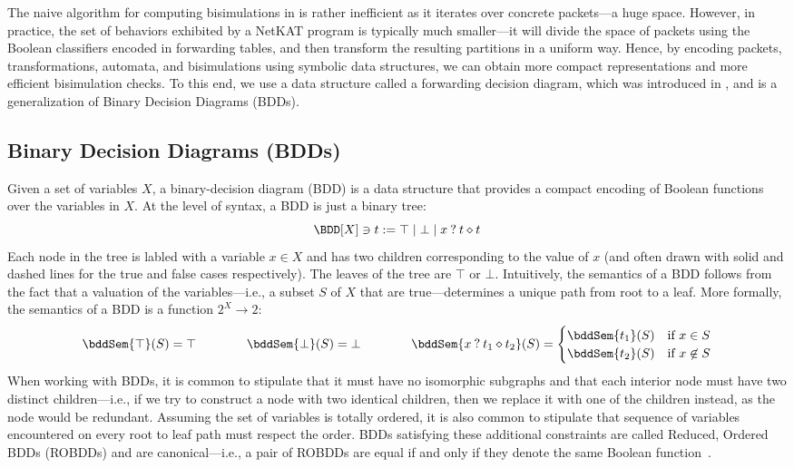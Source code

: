 
The naive algorithm for computing bisimulations in  is
rather inefficient as it iterates over concrete packets---a huge
space. However, in practice, the set of behaviors exhibited by a
NetKAT program is typically much smaller---it will divide the space of
packets using the Boolean classifiers encoded in forwarding tables,
and then transform the resulting partitions in a uniform way. Hence,
by encoding packets, transformations, automata, and bisimulations
using symbolic data structures, we can obtain more compact
representations and more efficient bisimulation checks. To this end,
we use a data structure called a forwarding decision diagram, which
was introduced in \cite{fastcompiler}, and is a generalization of
Binary Decision Diagrams (BDDs).

\subsection{Binary Decision Diagrams (BDDs)}

Given a set of variables $X$, a binary-decision diagram (BDD) is a
data structure that provides a compact encoding of Boolean functions
over the variables in $X$. At the level of syntax, a BDD is just a
binary tree:
\[
\BDD[X] \ni t := \top \mid \bot \mid x \mathbin{?} t \diamond t
\]
Each node in the tree is labled with a variable $x\in X$ and has two
children corresponding to the value of $x$ (and often drawn with solid
and dashed lines for the true and false cases respectively). The
leaves of the tree are $\top$ or $\bot$. Intuitively, the semantics of
a BDD follows from the fact that a valuation of the variables---i.e.,
a subset $S$ of $X$ that are true---determines a unique path from root
to a leaf. More formally, the semantics of a BDD is a function $2^X
\to 2$:
\[
\bddSem{\top}(S) = \top \qquad\qquad
\bddSem{\bot}(S) = \bot \qquad\qquad
\bddSem{x \mathbin{?} t_1 \diamond t_2}(S) = \begin{cases}
\bddSem{t_1}(S) &\text{if } x \in S\\
\bddSem{t_2}(S) &\text{if } x \not\in S
\end{cases}
\]
When working with BDDs, it is common to stipulate that it must have no
isomorphic subgraphs and that each interior node must have two
distinct children---i.e., if we try to construct a node with two
identical children, then we replace it with one of the children
instead, as the node would be redundant. Assuming the set of variables
is totally ordered, it is also common to stipulate that sequence of
variables encountered on every root to leaf path must respect the
order. BDDs satisfying these additional constraints are called
Reduced, Ordered BDDs (ROBDDs) and are canonical---i.e., a pair of
ROBDDs are equal if and only if they denote the same Boolean
function~\cite{bryant}.

